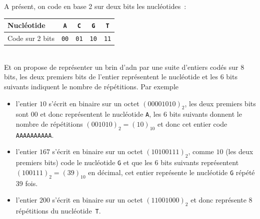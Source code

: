 \documentclass[11pt,a4paper]{article}
\begin{document}
\begin{Exercise}[title = Séquence génétique]
	\medskip{}
	A présent, on code en base 2 sur deux bits les nucléotides~:\phantom{\strut} \\
    \begin{tabular}{|l|c|c|c|c|}
        \hline
        Nucléotide & {\tt A} & {\tt C} & {\tt G} & {\tt T} \\
        \hline
        Code sur 2 bits & {\tt 00} & {\tt 01} & {\tt 10} & {\tt 11} \\
        \hline
    \end{tabular}\\
    Et on propose de représenter un brin d'{\sc adn} par une suite d'entiers codés sur 8 bits, les deux premiers bits de l'entier représentent le nucléotide et les 6 bits suivants indiquent le nombre de répétitions. Par exemple
    \begin{itemize}
    \item l'entier $10$ s'écrit en binaire sur un octet $(00001010)_2$, les deux premiers bits sont $00$ et donc représentent le nucléotide {\tt A}, les 6 bits suivants donnent le nombre de répétitions $(001010)_2 = (10)_{10}$ et donc cet entier code {\tt AAAAAAAAAA}.
    \item l'entier $167$ s'écrit en binaire sur un octet $(10100111)_2$, comme $10$ (les deux premiers bits) code le nucléotide {\tt G} et que les 6 bits suivants représentent $(100111)_2 = (39)_{10}$ en décimal, cet entier représente le nucléotide {\tt G} répété 39 fois.
    \item l'entier $200$ s'écrit en binaire sur un octet $(11001000)_2$ et donc représente 8 répétitions du nucléotide~{\tt T}.
    \end{itemize}
\end{Exercise}
\end{document}
